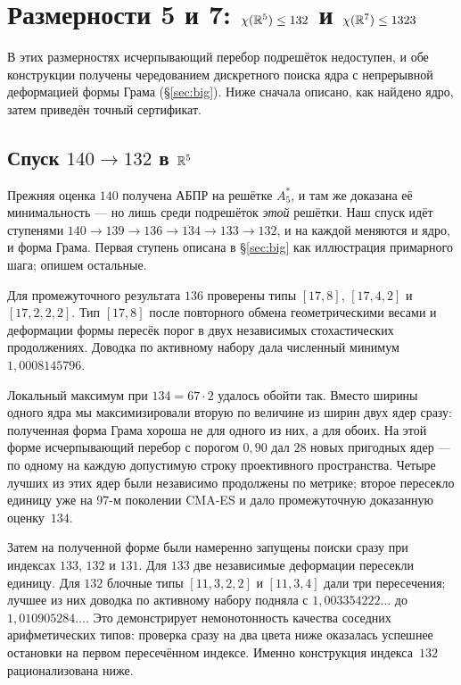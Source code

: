 \section{Размерности 5 и 7: $\chi(\mathbb{R}^5)\le132$ и $\chi(\mathbb{R}^7)\le1323$}
\label{sec:r57}

В этих размерностях исчерпывающий перебор подрешёток недоступен, и обе
конструкции получены чередованием дискретного поиска ядра с непрерывной
деформацией формы Грама (\S\ref{sec:big}). Ниже сначала описано, как найдено
ядро, затем приведён точный сертификат.

\subsection{Спуск $140\to132$ в $\mathbb{R}^5$}

Прежняя оценка $140$ получена АБПР на решётке $A_5^*$, и там же доказана её
минимальность --- но лишь среди подрешёток \emph{этой} решётки. Наш спуск идёт
ступенями $140\to139\to136\to134\to133\to132$, и на каждой меняются и ядро, и
форма Грама. Первая ступень описана в \S\ref{sec:big} как иллюстрация
примарного шага; опишем остальные.

Для промежуточного результата $136$ проверены типы
$[17,8]$, $[17,4,2]$ и $[17,2,2,2]$. Тип $[17,8]$ после повторного обмена
геометрическими весами и деформации формы пересёк порог в двух независимых
стохастических продолжениях. Доводка по активному набору дала численный минимум
$1{,}0008145796$.

Локальный максимум при $134=67\cdot2$ удалось обойти так. Вместо ширины одного
ядра мы максимизировали вторую по величине из ширин двух ядер сразу: полученная
форма Грама хороша не для одного из них, а для обоих. На этой форме
исчерпывающий перебор с порогом $0{,}90$ дал $28$ новых пригодных ядер --- по
одному на каждую допустимую строку проективного пространства. Четыре лучших из этих ядер были независимо продолжены по метрике;
второе пересекло единицу уже на $97$-м поколении CMA-ES и дало
промежуточную доказанную оценку~$134$.

Затем на полученной форме были намеренно запущены поиски сразу при индексах
$133$, $132$ и $131$. Для $133$ две независимые деформации пересекли единицу.
Для $132$ блочные типы $[11,3,2,2]$ и $[11,3,4]$ дали три пересечения;
лучшее из них доводка по активному набору подняла с $1{,}003354222\ldots$ до
$1{,}010905284\ldots$. Это демонстрирует немонотонность качества соседних
арифметических типов: проверка сразу на два цвета ниже оказалась успешнее
остановки на первом пересечённом индексе. Именно конструкция индекса~$132$
рационализована ниже.

